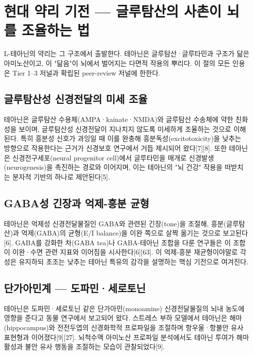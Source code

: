 \documentclass[12pt,oneside]{book}
\begin{document}
\section{현대 약리 기전 — 글루탐산의 사촌이 뇌를 조율하는 법}

L-테아닌의 약리는 그 구조에서 출발한다. 테아닌은 글루탐산·글루타민과 구조가 닮은 아미노산이고, 이 "닮음"이 뇌에서 벌어지는 다면적 작용의 뿌리다. 이 절의 모든 인용은 Tier 1–3 저널과 확립된 peer-review 저널에 한한다.

\subsection{글루탐산성 신경전달의 미세 조율}

테아닌은 글루탐산 수용체(AMPA·kainate·NMDA)와 글루탐산 수송체에 약한 친화성을 보이며, 글루탐산성 신경전달이 지나치지 않도록 미세하게 조율하는 것으로 이해된다. 특히 흥분성 신호가 과잉일 때 이를 완충해 흥분독성(excitotoxicity)을 낮추는 방향으로 작용한다는 근거가 신경보호 연구에서 거듭 제시되어 왔다[7][8]. 또한 테아닌은 신경전구세포(neural progenitor cell)에서 글루타민을 매개로 신경발생(neurogenesis)을 촉진하는 경로와 이어지며, 이는 테아닌의 "뇌 건강" 작용을 떠받치는 분자적 기반의 하나로 제안된다[5].

\subsection{GABA성 긴장과 억제-흥분 균형}

테아닌은 억제성 신경전달물질인 GABA와 관련된 긴장(tone)을 조절해, 흥분(글루탐산)과 억제(GABA)의 균형(E/I balance)을 이완 쪽으로 살짝 옮기는 것으로 보고된다[6]. GABA를 강화한 차(GABA tea)나 GABA-테아닌 조합을 다룬 연구들은 이 조합이 이완·수면 관련 지표와 이어짐을 시사한다[6][63]. 이 억제-흥분 재균형이야말로 각성은 유지하되 초조는 낮추는 테아닌 특유의 감각을 설명하는 핵심 기전으로 여겨진다.

\subsection{단가아민계 — 도파민·세로토닌}

테아닌은 도파민·세로토닌 같은 단가아민(monoamine) 신경전달물질의 뇌내 농도에 영향을 준다고 동물 연구에서 보고되어 왔다. 스트레스 부하 모델에서 테아닌은 해마(hippocampus)와 전전두엽의 신경화학적 프로파일을 조절하며 항우울·항불안 유사 표현형과 이어졌다[9][27]. 뇌척수액 아미노산 프로파일 분석에서도 테아닌 투여가 해마 활성과 불안 유사 행동을 조절하는 모습이 관찰되었다[9].
\end{document}
